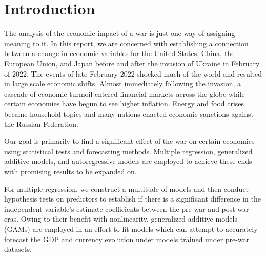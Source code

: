 \documentclass[11pt,regno]{amsart}
\theoremstyle{plain}
\numberwithin{equation}{section}
\begin{document}
\ 

\ 

\ 

\ 

\ 

\

\ 





\section*{Introduction}
The analysis of the economic impact of a war is just one way of assigning meaning to it. In this report, we are concerned with establishing a connection between a change in economic variables for the United States, China, the European Union, and Japan before and after the invasion of Ukraine in February of 2022. The events of late February 2022 shocked much of the world and resulted in large scale economic shifts. Almost immediately following the invasion, a cascade of economic turmoil entered financial markets across the globe while certain economies have begun to see higher inflation. Energy and food crises became household topics and many nations enacted economic sanctions against the Russian Federation.

Our goal is primarily to find a significant effect of the war on certain economies using statistical tests and forecasting methods. Multiple regression, generalized additive models, and autoregressive models are employed to achieve these ends with promising results to be expanded on.

For multiple regression, we construct a multitude of models and then conduct hypothesis tests on predictors to establish if there is a significant difference in the independent variable's estimate coefficients between the pre-war and post-war eras. Owing to their benefit with nonlinearity, generalized additive models (GAMs) are employed in an effort to fit models which can attempt to accurately forecast the GDP and currency evolution under models trained under pre-war datasets.
\end{document}
